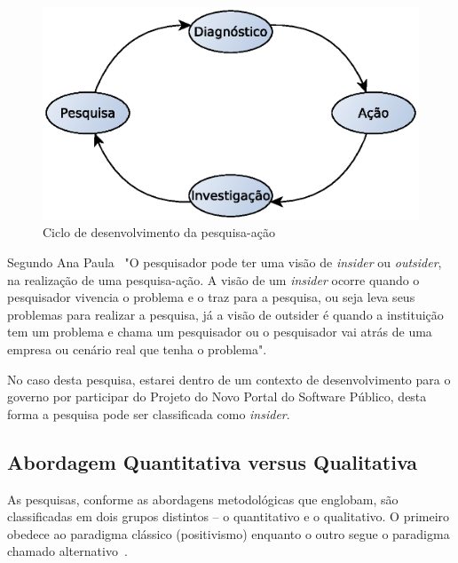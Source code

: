 \begin{figure}[htpb]
 \begin{center}
    \includegraphics[width=.70\textwidth]{figuras/pesquisa-acao.eps}
 \end{center}
  \caption{Ciclo de desenvolvimento da pesquisa-ação}
  \label{fig:pesquisa-acao}
\end{figure}

Segundo Ana Paula~\cite{dos2012aplicaccao} "O pesquisador pode ter uma visão de \emph{insider}
ou \emph{outsider}, na realização de uma pesquisa-ação.
A visão de um \emph{insider} ocorre quando o pesquisador vivencia o problema e o traz para a pesquisa,
ou seja leva seus problemas para realizar a pesquisa, já a visão de outsider é quando a instituição
tem um problema e chama um pesquisador ou o pesquisador vai atrás de uma empresa ou cenário
real que tenha o problema". 

No caso desta pesquisa, estarei dentro de um contexto de 
desenvolvimento para o governo por participar do Projeto do Novo Portal do Software
Público, desta forma a pesquisa pode ser classificada como \emph{insider}.


\subsection{Abordagem Quantitativa versus Qualitativa}

As pesquisas, conforme as abordagens metodológicas que englobam, são classificadas em
dois grupos distintos – o quantitativo e o qualitativo. O primeiro obedece ao paradigma
clássico (positivismo) enquanto o outro segue o paradigma chamado alternativo~\cite{terence2006abordagem}.

